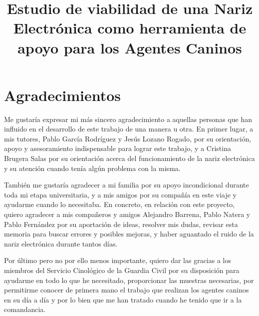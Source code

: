 \documentclass[hidelinks, headlogo, framedcover]{tfeEPCC}
\title{Estudio de viabilidad de una Nariz Electrónica como herramienta de apoyo para los Agentes Caninos}
\begin{document}

\sloppy%
\pagebreak%


\pagestyle{empty}



\setcounter{page}{1}
\chapter*{Agradecimientos} %
Me gustaría expresar mi más sincero agradecimiento a aquellas personas que han influido en el desarrollo de este trabajo de una manera u otra. En primer lugar, a mis tutores, Pablo García Rodríguez y Jesús Lozano Rogado, por su orientación, apoyo y asesoramiento indispensable para lograr este trabajo, y a Cristina Brugera Salas por su orientación acerca del funcionamiento de la nariz electrónica y su atención cuando tenía algún problema con la misma.
\par

También me gustaría agradecer a mi familia por su apoyo incondicional durante toda mi etapa universitaria, y a mis amigos por su compañía en este viaje y ayudarme cuando lo necesitaba. En concreto, en relación con este proyecto, quiero agradecer a mis compañeros y amigos Alejandro Barrena, Pablo Natera y Pablo Fernández por su aportación de ideas, resolver mis dudas, revisar esta memoria para buscar errores y posibles mejoras, y haber aguantado el ruido de la nariz electrónica durante tantos días.
\par

Por último pero no por ello menos importante, quiero dar las gracias a los miembros del Servicio Cinológico de la Guardia Civil por su disposición para ayudarme en todo lo que he necesitado, proporcionar las muestras necesarias, por permitirme conocer de primera mano el trabajo que realizan los agentes caninos en su día a día y por lo bien que me han tratado cuando he tenido que ir a la comandancia.
\end{document}

